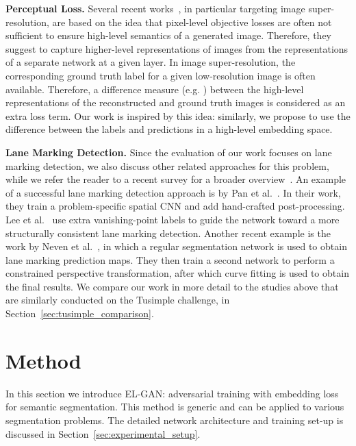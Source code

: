 \documentclass{article} \usepackage{nips13submit_e,times}
\newcommand{\elgan}{\mbox{EL-GAN}}
\begin{document}
\textbf{Perceptual Loss.}
Several recent works~\cite{sajjadi2017enhancenet,dosovitskiy2016generating,johnson2016perceptual}, in particular targeting image super-resolution, are based on the idea that pixel-level objective losses are often not sufficient to ensure high-level semantics of a generated image.
Therefore, they suggest to capture higher-level representations of images from the representations of a separate network at a given layer.
In image super-resolution, the corresponding ground truth label for a given low-resolution image is often available.
Therefore, a difference measure (e.g. ) between the high-level representations of the reconstructed and ground truth images is considered as an extra loss term.
Our work is inspired by this idea: similarly, we propose to use the difference between the labels and predictions in a high-level embedding space.


\textbf{Lane Marking Detection.}
Since the evaluation of our work focuses on lane marking detection, we also discuss other related approaches for this problem, while we refer the reader to a recent survey for a broader overview~\cite{barhillel2014recent}.
An example of a successful lane marking detection approach is by Pan et al.~\cite{pan2017spatial}.
In their work, they train a problem-specific spatial CNN and add hand-crafted post-processing.
Lee et al.~\cite{lee2017vpgnet} use extra vanishing-point labels to guide the network toward a more structurally consistent lane marking detection.
Another recent example is the work by Neven et al.~\cite{neven2018towards}, in which a regular segmentation network is used to obtain lane marking prediction maps.
They then train a second network to perform a constrained perspective transformation, after which curve fitting is used to obtain the final results.
We compare our work in more detail to the studies above \cite{neven2018towards,pan2017spatial} that are similarly conducted on the Tusimple challenge, in Section~\ref{sec:tusimple_comparison}.




\section{Method}
\label{sec:method}

In this section we introduce \elgan{}: adversarial training with embedding loss for semantic segmentation.
This method is generic and can be applied to various segmentation problems.
The detailed network architecture and training set-up is discussed in Section~\ref{sec:experimental_setup}.
\end{document}
